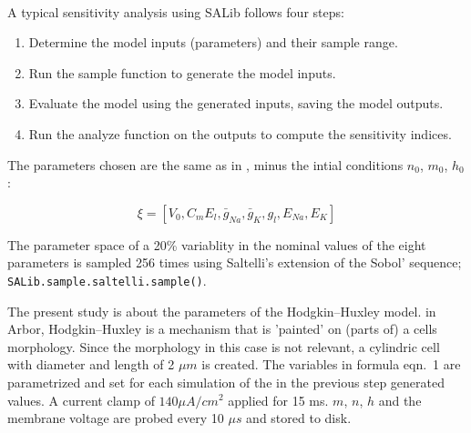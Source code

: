 \documentclass{beamer}
\begin{document}
\begin{frame}[t, fragile]
\begin{columns}[onlytextwidth]
\begin{column}{.49\linewidth}

      \textbf{}\\
      A typical sensitivity analysis using SALib follows four steps:
      \begin{enumerate}
      \item Determine the model inputs (parameters) and their sample range.
      \item Run the sample function to generate the model inputs.
      \item Evaluate the model using the generated inputs, saving the model outputs.
      \item Run the analyze function on the outputs to compute the sensitivity indices.
      \end{enumerate}

      The parameters chosen are the same as in \citeauthor{TorresValderrama2015} \citeyear{TorresValderrama2015}, 
      minus the intial conditions $n_0$, $m_0$, $h_0$:
      
      \vspace*{-2ex}
      \begin{equation}
        \xi = [ V_0, C_m E_{l}, \bar{g}_{Na}, \bar{g}_{K}, g_{l}, E_{Na}, E_{K} ]
      \end{equation}

      The parameter space of a 20\% variablity in the nominal values of the eight parameters is sampled 256 times using Saltelli’s\cite{Saltelli2004} extension of the Sobol’ sequence; \texttt{SALib.sample.saltelli.sample()}.

      The present study is about the parameters of the Hodgkin–Huxley model. in
      Arbor, Hodgkin–Huxley is a mechanism that is 'painted' on (parts of) a cells
      morphology. Since the morphology in this case is not relevant, a cylindric 
      cell with diameter and length of 2 $\mu m$ is created. The variables 
      in formula eqn.~1 are parametrized and set for each simulation of the in the
      previous step generated values. A current clamp of $140 \mu A/cm^2$ applied for 15
      ms. $m$, $n$, $h$ and the membrane voltage are probed every 10 $\mu s$ and stored to disk.


\end{column}
\end{columns}
\end{frame}
\end{document}
